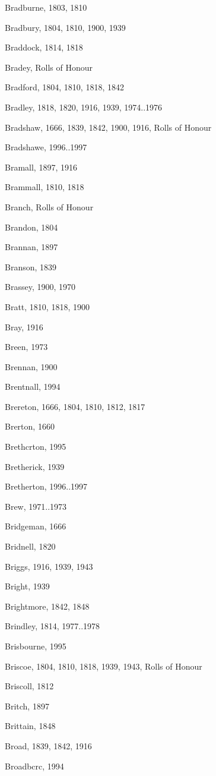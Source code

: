 \begin{theindex}
\item Bradburne, 1803, 1810
\item Bradbury, 1804, 1810, 1900, 1939
\item Braddock, 1814, 1818
\item Bradey, Rolls of Honour
\item Bradford, 1804, 1810, 1818, 1842
\item Bradley, 1818, 1820, 1916, 1939, 1974..1976
\item Bradshaw, 1666, 1839, 1842, 1900, 1916, Rolls of Honour
\item Bradshawe, 1996..1997
\item Bramall, 1897, 1916
\item Brammall, 1810, 1818
\item Branch, Rolls of Honour
\item Brandon, 1804
\item Brannan, 1897
\item Branson, 1839
\item Brassey, 1900, 1970
\item Bratt, 1810, 1818, 1900
\item Bray, 1916
\item Breen, 1973
\item Brennan, 1900
\item Brentnall, 1994
\item Brereton, 1666, 1804, 1810, 1812, 1817
\item Brerton, 1660
\item Brethcrton, 1995
\item Bretherick, 1939
\item Bretherton, 1996..1997
\item Brew, 1971..1973
\item Bridgeman, 1666
\item Bridnell, 1820
\item Briggs, 1916, 1939, 1943
\item Bright, 1939
\item Brightmore, 1842, 1848
\item Brindley, 1814, 1977..1978
\item Brisbourne, 1995
\item Briscoe, 1804, 1810, 1818, 1939, 1943, Rolls of Honour
\item Briscoll, 1812
\item Britch, 1897
\item Brittain, 1848
\item Broad, 1839, 1842, 1916
\item Broadbcrc, 1994

\end{theindex}
